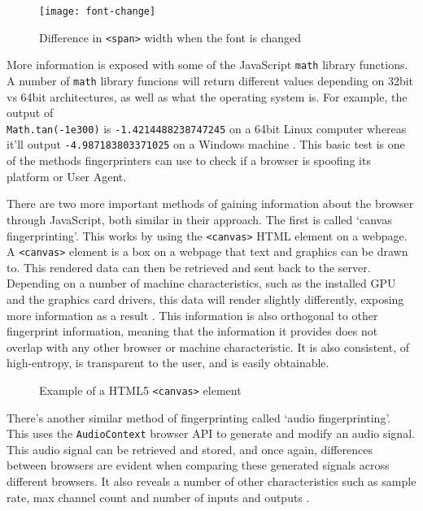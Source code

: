 \begin{figure}[h]
\texttt{[image: font-change]}
\centering
\caption{Difference in \texttt{<span>} width when the font is changed}
\label{fig:font-change}
\end{figure}

More information is exposed with some of the JavaScript \texttt{math} library functions.
A number of \texttt{math} library funcions will return different values depending on 32bit vs 64bit architectures, as well as what the operating system is.
For example, the output of \\
\texttt{Math.tan(-1e300)} is \texttt{-1.4214488238747245} on a 64bit Linux computer whereas it'll output \texttt{-4.987183803371025} on a Windows machine \citep{floating-point-bug}.
This basic test is one of the methods fingerprinters can use to check if a browser is spoofing its platform or User Agent.

There are two more important methods of gaining information about the browser through JavaScript, both similar in their approach.
The first is called `canvas fingerprinting'.
This works by using the \texttt{<canvas>} HTML element on a webpage.
A \texttt{<canvas>} element is a box on a webpage that text and graphics can be drawn to.
This rendered data can then be retrieved and sent back to the server.
Depending on a number of machine characteristics, such as the installed GPU and the graphics card drivers, this data will render slightly differently, exposing more information as a result \citep{canvas-fingerprint}.
This information is also orthogonal to other fingerprint information, meaning that the information it provides does not overlap with any other browser or machine characteristic.
It is also consistent, of high-entropy, is transparent to the user, and is easily obtainable.

\begin{figure}[h]
\centering
\label{fig:canvas-example}
\caption{Example of a HTML5 \texttt{<canvas>} element}
\end{figure}

There's another similar method of fingerprinting called `audio fingerprinting'.
This uses the \texttt{AudioContext} browser API to generate and modify an audio signal.
This audio signal can be retrieved and stored, and once again, differences between browsers are evident when comparing these generated signals across different browsers.
It also reveals a number of other characteristics such as sample rate, max channel count and number of inputs and outputs \citep{audio-fingerprint}.

